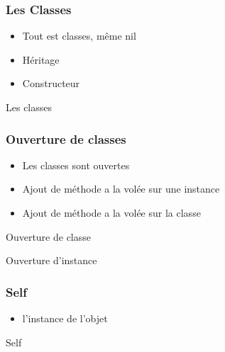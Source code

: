\documentclass{beamer}
\begin{document}
\begin{frame}
  \frametitle{Les Classes}
  \begin{itemize}
    \item Tout est classes, même nil
    \item H\'eritage
    \item Constructeur
  \end{itemize}
\end{frame}

\begin{frame}
  \begin{beamerboxesrounded}{Les classes}
    
  \end{beamerboxesrounded}
\end{frame}

\begin{frame}
  \frametitle{Ouverture de classes}
  \begin{itemize}
    \item Les classes sont ouvertes
    \item Ajout de m\'ethode a la vol\'ee sur une instance
    \item Ajout de m\'ethode a la vol\'ee sur la classe
  \end{itemize}
\end{frame}

\begin{frame}
  \begin{beamerboxesrounded}{Ouverture de classe}
    
  \end{beamerboxesrounded}
\end{frame}

\begin{frame}
  \begin{beamerboxesrounded}{Ouverture d'instance}
    
  \end{beamerboxesrounded}
\end{frame}

\begin{frame}
  \frametitle{Self}
  \begin{itemize}
    \item l'instance de l'objet
  \end{itemize}
\end{frame}

\begin{frame}
  \begin{beamerboxesrounded}{Self}
    
  \end{beamerboxesrounded}
\end{frame}
\end{document}
